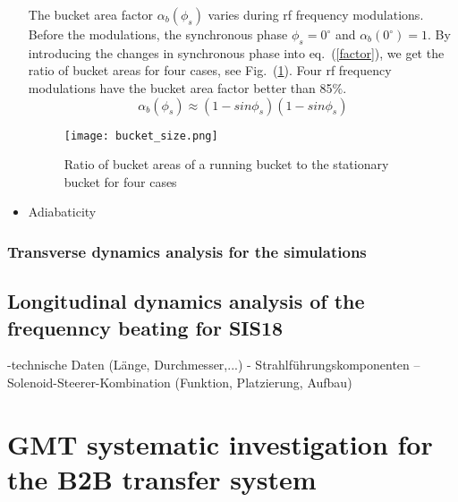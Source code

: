 \begin{itemize}
The bucket area factor $\alpha_b (\phi_s) $ varies during rf frequency modulations. Before the modulations, the synchronous phase $\phi_s=0^\circ$ and  $\alpha_b(0^\circ) = 1$. By introducing the changes in synchronous phase into eq.~(\ref{factor}), we get the ratio of bucket areas for four cases, see Fig.~(\ref{bucket_size}). Four rf frequency modulations have the bucket area factor better than 85$\%$.
\begin{equation}
\alpha_b (\phi_s) \approx (1-sin \phi_s)(1-sin \phi_s)\label{factor}
\end{equation}
\begin{figure}[!htb]
   \centering   
   \texttt{[image: bucket\_size.png]}
   \caption{Ratio of bucket areas of a running bucket to the stationary bucket for four cases}
   \label{bucket_size}
\end{figure}
\item Adiabaticity


\end{itemize}
\subsubsection{Transverse dynamics analysis for the simulations}

\subsection{Longitudinal dynamics analysis of the frequenncy beating for SIS18}
-technische Daten (Länge, Durchmesser,...)
- Strahlführungskomponenten
--Solenoid-Steerer-Kombination (Funktion, Platzierung, Aufbau)
\section{GMT systematic investigation for the B2B transfer system}
